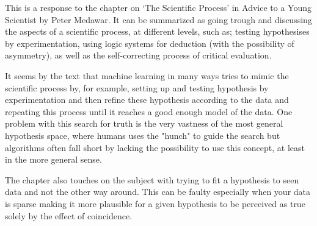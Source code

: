 \documentclass{article}
\begin{document}

    This is a response to the chapter on `The Scientific Process' in 
    Advice to a Young Scientist by Peter Medawar. It can be summarized as going
    trough and discussing the aspects of a scientific process, at different levels,
    such as; testing
    hypothesises by experimentation, using logic systems for deduction (with the
    possibility of asymmetry), as well as the self-correcting process of critical 
    evaluation.

    It seems by the text that machine learning in many ways tries to mimic the scientific
    process by, for example, setting up and testing hypothesis by
    experimentation and then refine these hypothesis according to the data and repeating
    this process
    until it reaches a good enough model of the data. One problem with this search
    for truth is the very
    vastness of the most general hypothesis space, where humans uses the "hunch" to
    guide the search but algorithms often fall short by lacking the possibility
    to use this concept, at least in the more general sense.

    The chapter also touches on the subject with trying to fit a hypothesis to seen
    data and not the other way around. This can be faulty especially when your
    data is sparse making it more plausible for a given hypothesis to
    be perceived as true solely by the effect of coincidence.
\end{document}
